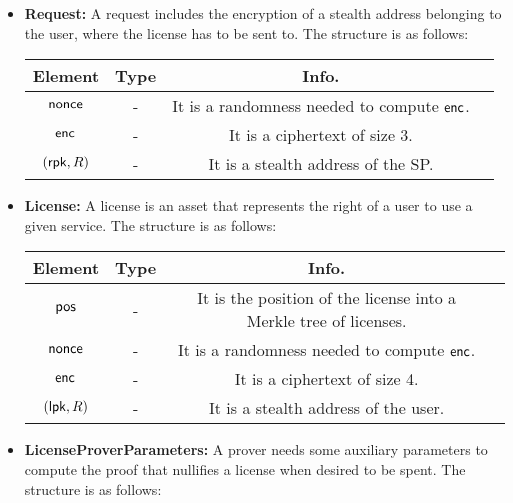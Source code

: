 \begin{itemize}
    \item \textbf{Request:} A request includes the encryption of a stealth address belonging to the user, where the license has to be sent to. The structure is as follows:

    \begin{center}
        \begin{tabular}{ |c|c|c|c| } 
        \hline
        \textbf{Element} & \textbf{Type} & \textbf{Info.} \\
        \hline
        $\mathsf{nonce}$ & - & It is a randomness needed to compute $\mathsf{enc}$. \\ 
        $\mathsf{enc}$ & - & It is a ciphertext of size 3. \\
        $(\mathsf{rpk}, R)$ & - & It is a stealth address of the SP. \\
        \hline
        \end{tabular}
    \end{center}


    \item \textbf{License:} A license is an asset that represents the right of a user to use a given service. The structure is as follows:

    \begin{center}
        \begin{tabular}{ |c|c|c|c| } 
        \hline
        \textbf{Element} & \textbf{Type} & \textbf{Info.} \\
        \hline
        $\mathsf{pos}$ & - & It is the position of the license into a Merkle tree of licenses. \\ 
        $\mathsf{nonce}$ & - & It is a randomness needed to compute $\mathsf{enc}$. \\ 
        $\mathsf{enc}$ & - & It is a ciphertext of size 4. \\
        $(\mathsf{lpk}, R)$ & - & It is a stealth address of the user. \\
        \hline
        \end{tabular}
    \end{center}

    \item \textbf{LicenseProverParameters:} A prover needs some auxiliary parameters to compute the proof that nullifies a license when desired to be spent. The structure is as follows:


\end{itemize}
